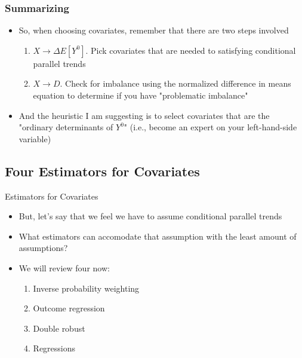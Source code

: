 \documentclass{beamer}
\begin{document}
\begin{frame}
    \frametitle{Summarizing}
    \begin{itemize}
    \item So, when choosing covariates, remember that there are two steps involved
    	\begin{enumerate}
	\item $X \rightarrow \Delta E[Y^0]$. Pick covariates that are needed to satisfying conditional parallel trends
	\item $X \rightarrow D$. Check for imbalance using the normalized difference in means equation to determine if you have "problematic imbalance"
	\end{enumerate}
\item And the heuristic I am suggesting is to select covariates that are the "ordinary determinants of $Y^0$" (i.e., become an expert on your left-hand-side variable)
    \end{itemize}
\end{frame}






\subsection{Four Estimators for Covariates}

\begin{frame}{Estimators for Covariates}

\begin{itemize}

\item But, let's say that we feel we have to assume conditional parallel trends
\item What estimators can accomodate that assumption with the least amount of assumptions?
\item We will review four now:
	\begin{enumerate}
	\item Inverse probability weighting
	\item Outcome regression
	\item Double robust
	\item Regressions
	\end{enumerate}
\end{itemize}

\end{frame}
\end{document}
